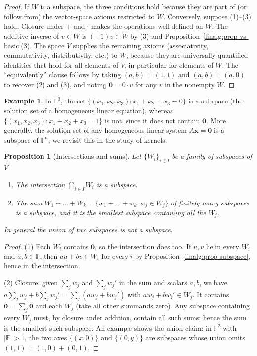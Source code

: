 \documentclass[11pt,a4paper]{article}
\newtheorem{proposition}[theorem]{Proposition}
\theoremstyle{definition}
\newtheorem{example}[theorem]{Example}
\theoremstyle{remark}
\newcommand{\F}{\ensuremath{\mathbb{F}}}
\begin{document}
\begin{proof}
If \(W\) is a subspace, the three conditions hold because they are part of (or follow from) the vector-space axioms restricted to \(W\). Conversely, suppose (1)–(3) hold. Closure under \(+\) and \(\cdot\) makes the operations well defined on \(W\). The additive inverse of \(v \in W\) is \((-1)v \in W\) by (3) and Proposition~\ref{linalg:prop-vs-basic}(3). The space \(V\) supplies the remaining axioms (associativity, commutativity, distributivity, etc.) to \(W\), because they are universally quantified identities that hold for all elements of \(V\), in particular for elements of \(W\). The ``equivalently'' clause follows by taking \((a,b) = (1,1)\) and \((a,b)=(a,0)\) to recover (2) and (3), and noting \(\mathbf 0 = 0\cdot v\) for any \(v\) in the nonempty \(W\).
\end{proof}

\begin{example}\label{linalg:exa-subspace}
In \(\F^3\), the set \(\{(x_1, x_2, x_3) : x_1 + x_2 + x_3 = 0\}\) is a subspace (the solution set of a homogeneous linear equation), whereas \(\{(x_1,x_2,x_3) : x_1 + x_2 + x_3 = 1\}\) is not, since it does not contain \(\mathbf 0\). More generally, the solution set of any homogeneous linear system \(A\mathbf x = \mathbf 0\) is a subspace of \(\F^n\); we revisit this in the study of kernels.
\end{example}

\begin{proposition}[Intersections and sums]\label{linalg:prop-int-sum}
Let \(\{W_i\}_{i \in I}\) be a family of subspaces of \(V\).
\begin{enumerate}
\item The intersection \(\bigcap_{i \in I} W_i\) is a subspace.
\item The \emph{sum} \(W_1 + \dots + W_k = \{ w_1 + \dots + w_k : w_j \in W_j \}\) of finitely many subspaces is a subspace, and it is the smallest subspace containing all the \(W_j\).
\end{enumerate}
In general the \emph{union} of two subspaces is \emph{not} a subspace.
\end{proposition}

\begin{proof}
(1) Each \(W_i\) contains \(\mathbf 0\), so the intersection does too. If \(u, v\) lie in every \(W_i\) and \(a, b \in \F\), then \(au + bv \in W_i\) for every \(i\) by Proposition~\ref{linalg:prop-subspace}, hence in the intersection.

(2) Closure: given \(\sum_j w_j\) and \(\sum_j w_j'\) in the sum and scalars \(a,b\), we have \(a\sum_j w_j + b\sum_j w_j' = \sum_j (a w_j + b w_j')\) with \(a w_j + b w_j' \in W_j\). It contains \(\mathbf 0 = \sum_j \mathbf 0\) and each \(W_j\) (take all other summands zero). Any subspace containing every \(W_j\) must, by closure under addition, contain all such sums; hence the sum is the smallest such subspace. An example shows the union claim: in \(\F^2\) with \(|\F| > 1\), the two axes \(\{(x,0)\}\) and \(\{(0,y)\}\) are subspaces whose union omits \((1,1) = (1,0)+(0,1)\).
\end{proof}
\end{document}
